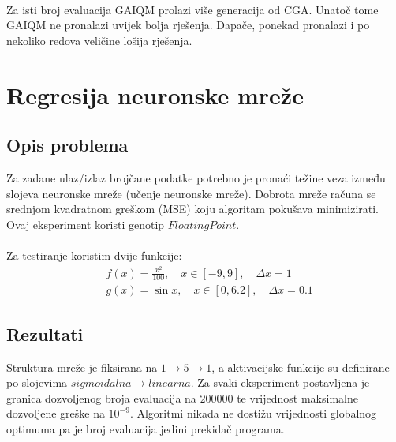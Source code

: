 \documentclass[times, utf8, zavrsni, numeric]{fer}
\begin{document}
\paragraph{}
Za isti broj evaluacija GAIQM prolazi više generacija od CGA. Unatoč tome GAIQM ne pronalazi uvijek bolja rješenja. Dapače, ponekad pronalazi i po nekoliko redova veličine lošija rješenja.

\section{Regresija neuronske mreže}
\subsection{Opis problema}
Za zadane ulaz/izlaz brojčane podatke potrebno je pronaći težine veza između slojeva neuronske mreže (učenje neuronske mreže). Dobrota mreže računa se srednjom kvadratnom greškom (MSE) koju algoritam pokušava minimizirati. Ovaj eksperiment koristi genotip $FloatingPoint$.

\paragraph{}
Za testiranje koristim dvije funkcije:
\begin{align*}
&f(x) = \frac{x^2}{100},\quad x \in [-9, 9], \quad \Delta x = 1 \\
&g(x) = \sin{x},\quad x \in [0, 6.2], \quad \Delta x = 0.1
\end{align*}

\newpage

\subsection{Rezultati}
Struktura mreže je fiksirana na $1\to 5\to 1$, a aktivacijske funkcije su definirane po slojevima $sigmoidalna \to linearna$. Za svaki eksperiment postavljena je granica dozvoljenog broja evaluacija na $200000$ te vrijednost maksimalne dozvoljene greške na $10^{-9}$. Algoritmi nikada ne dostižu vrijednosti globalnog optimuma pa je broj evaluacija jedini prekidač programa.
\end{document}
